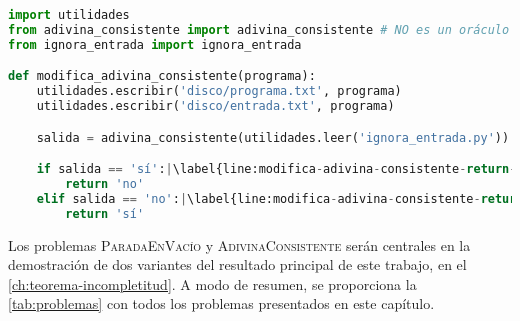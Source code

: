 \vspace{8pt}
\begin{lstlisting}[language=Python, caption=\lstinline{modifica_adivina_consistente.py},label={lst:modifica-adivina-consistente}]
import utilidades
from adivina_consistente import adivina_consistente # NO es un oráculo
from ignora_entrada import ignora_entrada

def modifica_adivina_consistente(programa):
    utilidades.escribir('disco/programa.txt', programa)
    utilidades.escribir('disco/entrada.txt', programa)

    salida = adivina_consistente(utilidades.leer('ignora_entrada.py'))|\label{line:modifica-adivina-consistente-salida}|

    if salida == 'sí':|\label{line:modifica-adivina-consistente-return-no}|
        return 'no'
    elif salida == 'no':|\label{line:modifica-adivina-consistente-return-si}|
        return 'sí'
\end{lstlisting}

Los problemas \textsc{ParadaEnVacío} y \textsc{AdivinaConsistente} serán centrales en la demostración de dos variantes del resultado principal de este trabajo, en el \cref{ch:teorema-incompletitud}. A modo de resumen, se proporciona la \cref{tab:problemas} con todos los problemas presentados en este capítulo.

